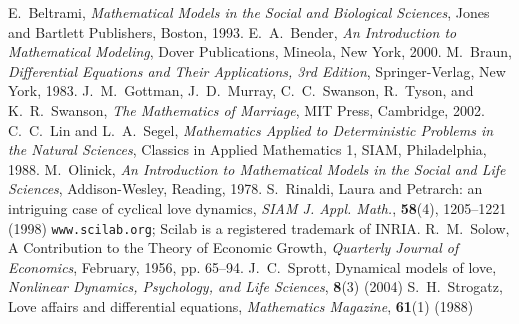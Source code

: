 \documentclass[reqno]{immbook}
\numberwithin{equation}{chapter}
\numberwithin{question}{section}
\numberwithin{theorem}{chapter}
\numberwithin{figure}{chapter}
\theoremstyle{definition}
\begin{document}
\endappendix
\backmatter

\begin{thebibliography}{99}
E.~Beltrami,
\emph{Mathematical Models in the Social and Biological Sciences},
Jones and Bartlett Publishers, Boston, 1993.
E.~A.~Bender,
\emph{An Introduction to Mathematical Modeling},
Dover Publications, Mineola, New York, 2000.
M.~Braun, \emph{Differential Equations and Their Applications,
3rd Edition},
Springer-Verlag, New York, 1983.
J.~M.~Gottman, J.~D.~Murray, C.~C.~Swanson,
R.~Tyson, and K.~R.~Swanson,
\emph{The Mathematics of Marriage},
MIT Press, Cambridge, 2002.
C.~C.~Lin and L.~A.~Segel,
\emph{Mathematics Applied to Deterministic
Problems in the Natural Sciences},
Classics in Applied Mathematics 1,
SIAM, Philadelphia, 1988.
M.~Olinick,
\emph{An Introduction to Mathematical Models
in the Social and Life Sciences},
Addison-Wesley, Reading, 1978.
S.~Rinaldi, Laura and Petrarch: an intriguing case of
cyclical love dynamics,
\emph{SIAM J. Appl. Math.}, \textbf{58}(4), 1205--1221 (1998)
\texttt{www.scilab.org}; Scilab is a registered trademark
of INRIA.
R.~M.~Solow, A Contribution to the Theory of Economic Growth,
\emph{Quarterly Journal of Economics}, February, 1956, pp. 65--94.
J.~C.~Sprott,
Dynamical models of love,
\emph{Nonlinear Dynamics, Psychology, and Life Sciences},
\textbf{8}(3) (2004)
S.~H.~Strogatz, Love affairs and differential equations,
\emph{Mathematics Magazine}, \textbf{61}(1) (1988)
\end{thebibliography}
\printindex
\end{document}
